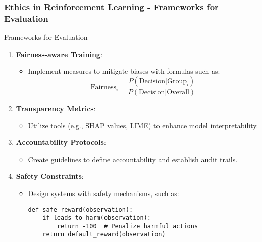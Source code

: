 \documentclass[aspectratio=169]{beamer}
\begin{document}
\begin{frame}[fragile]
    \frametitle{Ethics in Reinforcement Learning - Frameworks for Evaluation}
    \begin{block}{Frameworks for Evaluation}
        \begin{enumerate}
            \item \textbf{Fairness-aware Training}:
                \begin{itemize}
                    \item Implement measures to mitigate biases with formulas such as:
                    \[
                    \text{Fairness}_i = \frac{P(\text{Decision} | \text{Group}_i)}{P(\text{Decision} | \text{Overall})}
                    \]
                \end{itemize}

            \item \textbf{Transparency Metrics}:
                \begin{itemize}
                    \item Utilize tools (e.g., SHAP values, LIME) to enhance model interpretability.
                \end{itemize}
            
            \item \textbf{Accountability Protocols}:
                \begin{itemize}
                    \item Create guidelines to define accountability and establish audit trails.
                \end{itemize}

            \item \textbf{Safety Constraints}:
                \begin{itemize}
                    \item Design systems with safety mechanisms, such as:
                    \begin{lstlisting}
def safe_reward(observation):
    if leads_to_harm(observation):
        return -100  # Penalize harmful actions
    return default_reward(observation)
                    \end{lstlisting}
                \end{itemize}
        \end{enumerate}
    \end{block}
\end{frame}
\end{document}
